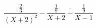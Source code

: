 \begin{displaymath}
  \frac{\frac{2}{3}}{(X+2)^2} - \frac{\frac{1}{9}}{X+2} + \frac{\frac{1}{9}}{X-1}
\end{displaymath}
